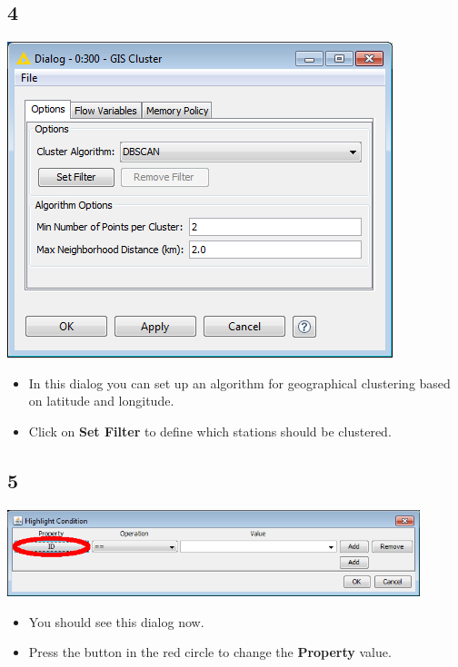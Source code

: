 \documentclass{beamer}
\begin{document}
\subsection{4}
\begin{frame}
	\begin{center}
  		\includegraphics[height=0.6\textheight]{4.png}
	\end{center}
	\begin{itemize}
		\item In this dialog you can set up an algorithm for geographical clustering based on latitude and longitude.
		\item Click on \textbf{Set Filter} to define which stations should be clustered.
	\end{itemize}
\end{frame}

\subsection{5}
\begin{frame}
	\begin{center}
  		\includegraphics[width=0.9\textwidth]{5.png}
	\end{center}
	\begin{itemize}
		\item You should see this dialog now.
		\item Press the button in the red circle to change the \textbf{Property} value.
	\end{itemize}
\end{frame}
\end{document}
